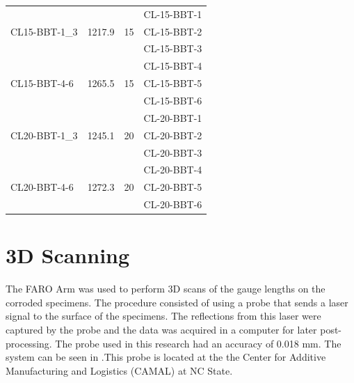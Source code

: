 \begin{table}[htbp]
\begin{tabular}{lccl}
\multirow{3}{*}{CL15-BBT-1\_3} & \multirow{3}{*}{1217.9} & \multirow{3}{*}{15} & CL-15-BBT-1           \\
                               &                         &                     & CL-15-BBT-2           \\
                               &                         &                     & CL-15-BBT-3           \\
\multirow{3}{*}{CL15-BBT-4-6}  & \multirow{3}{*}{1265.5} & \multirow{3}{*}{15} & CL-15-BBT-4           \\
                               &                         &                     & CL-15-BBT-5           \\
                               &                         &                     & CL-15-BBT-6           \\
\multirow{3}{*}{CL20-BBT-1\_3} & \multirow{3}{*}{1245.1} & \multirow{3}{*}{20} & CL-20-BBT-1           \\
                               &                         &                     & CL-20-BBT-2           \\
                               &                         &                     & CL-20-BBT-3           \\
\multirow{3}{*}{CL20-BBT-4-6}  & \multirow{3}{*}{1272.3} & \multirow{3}{*}{20} & CL-20-BBT-4           \\
                               &                         &                     & CL-20-BBT-5           \\
                               &                         &                     & CL-20-BBT-6          
\end{tabular}
\end{table}

\section{3D Scanning}

The FARO Arm \cite{FAROTechnologiesInc.2022} was used to perform 3D scans of the gauge lengths on the corroded specimens. The procedure consisted of using a probe that sends a laser signal to the surface of   the specimens. The reflections from this laser were captured by the probe and the data was acquired in a computer for later post-processing. The probe used in this research had an accuracy of 0.018 mm. The system can be seen in .This probe is located at the the Center for Additive Manufacturing and Logistics (CAMAL) at NC State.

